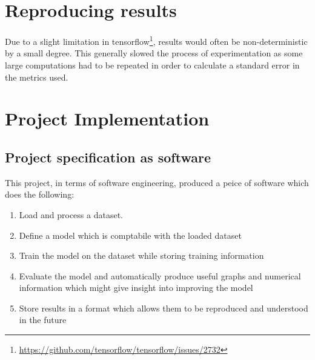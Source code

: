   \section{Reproducing results} \label{sec:GPU}
    Due to a slight limitation in tensorflow\footnote{\url{https://github.com/tensorflow/tensorflow/issues/2732}}, results would often be non-deterministic by a small degree. This generally slowed
    the process of experimentation as some large computations had to be repeated in order to calculate a standard error in the metrics used.
  \section{Project Implementation}
  \subsection{Project specification as software}
  This project, in terms of software engineering, produced a peice of software which does the following:
  \begin{enumerate}
    \item Load and process a dataset.
    \item Define a model which is comptabile with the loaded dataset
    \item Train the model on the dataset while storing training information
    \item Evaluate the model and automatically produce useful graphs and numerical information which might give insight into improving the model
    \item Store results in a format which allows them to be reproduced and understood in the future
  \end{enumerate}



